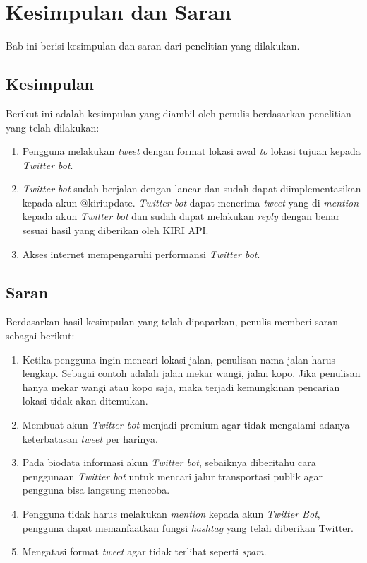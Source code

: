 \chapter{Kesimpulan dan Saran}
\label{chap:kesimpulan dan saran}

Bab ini berisi kesimpulan dan saran dari penelitian yang dilakukan.

\section{Kesimpulan}
Berikut ini adalah kesimpulan yang diambil oleh penulis berdasarkan penelitian yang telah dilakukan:

\begin{enumerate}
	\item Pengguna melakukan \textit{tweet} dengan format lokasi awal \textit{to} lokasi tujuan kepada \textit{Twitter bot}.
	\item \textit{Twitter bot} sudah berjalan dengan lancar dan sudah dapat diimplementasikan kepada akun @kiriupdate. \textit{Twitter bot} dapat menerima \textit{tweet} yang di-\textit{mention} kepada akun \textit{Twitter bot} dan sudah dapat melakukan \textit{reply} dengan benar sesuai hasil yang diberikan oleh KIRI API.
	\item Akses internet mempengaruhi performansi \textit{Twitter bot}.
\end{enumerate}

\section{Saran}
Berdasarkan hasil kesimpulan yang telah dipaparkan, penulis memberi saran sebagai berikut:

\begin{enumerate}
	\item Ketika pengguna ingin mencari lokasi jalan, penulisan nama jalan harus lengkap. Sebagai contoh adalah jalan mekar wangi, jalan kopo. Jika penulisan hanya mekar wangi atau kopo saja, maka terjadi kemungkinan pencarian lokasi tidak akan ditemukan.
	\item Membuat akun \textit{Twitter bot} menjadi premium agar tidak mengalami adanya keterbatasan \textit{tweet} per harinya.
	\item Pada biodata informasi akun \textit{Twitter bot}, sebaiknya diberitahu cara penggunaan \textit{Twitter bot} untuk mencari jalur transportasi publik agar pengguna bisa langsung mencoba.
	\item Pengguna tidak harus melakukan \textit{mention} kepada akun \textit{Twitter Bot}, pengguna dapat memanfaatkan fungsi \textit{hashtag} yang telah diberikan Twitter.
	\item Mengatasi format \textit{tweet} agar tidak terlihat seperti \textit{spam}.
\end{enumerate}